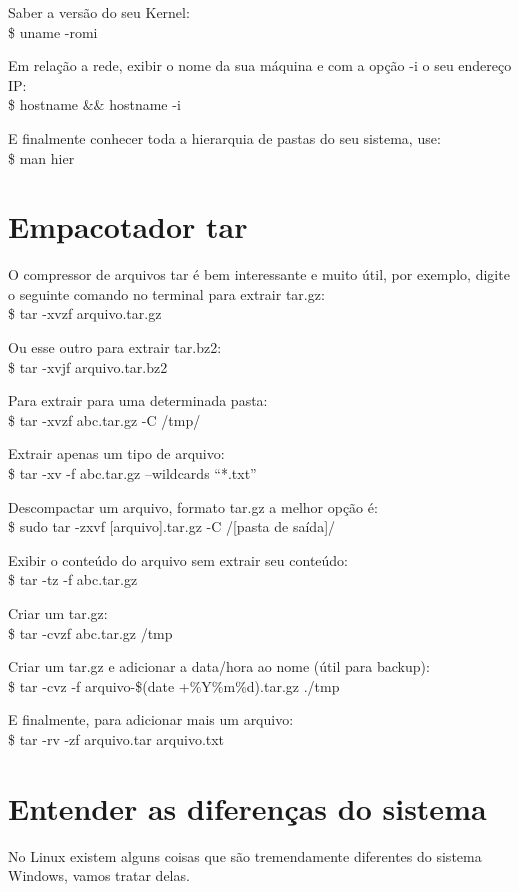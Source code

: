 Saber a versão do seu Kernel: \\
{\ttfamily\$ uname -romi}

Em relação a rede, exibir o nome da sua máquina e com a opção -i o seu endereço IP: \\
{\ttfamily\$ hostname \&\& hostname -i}

E finalmente conhecer toda a hierarquia de pastas do seu sistema, use: \\
{\ttfamily\$ man hier}

\section{Empacotador tar}
O compressor de arquivos tar é bem interessante e muito útil, por exemplo, digite o seguinte comando no terminal para extrair tar.gz: \\
{\ttfamily\$ tar -xvzf arquivo.tar.gz}

Ou esse outro para extrair tar.bz2: \\
{\ttfamily\$ tar -xvjf arquivo.tar.bz2}

Para extrair para uma determinada pasta: \\
{\ttfamily\$ tar -xvzf abc.tar.gz -C /tmp/}

Extrair apenas um tipo de arquivo: \\
{\ttfamily\$ tar -xv -f abc.tar.gz –wildcards ``*.txt''}

Descompactar um arquivo, formato tar.gz a melhor opção é: \\
{\ttfamily\$ sudo tar -zxvf [arquivo].tar.gz -C /[pasta de saída]/}

Exibir o conteúdo do arquivo sem extrair seu conteúdo: \\
{\ttfamily\$ tar -tz -f abc.tar.gz}

Criar um tar.gz: \\
{\ttfamily\$ tar -cvzf abc.tar.gz /tmp}

Criar um tar.gz e adicionar a data/hora ao nome (útil para backup): \\
{\ttfamily\$ tar -cvz -f arquivo-\$(date +\%Y\%m\%d).tar.gz ./tmp}

E finalmente, para adicionar mais um arquivo: \\
{\ttfamily\$ tar -rv -zf arquivo.tar arquivo.txt}

\section{Entender as diferenças do sistema}
No Linux existem alguns coisas que são tremendamente diferentes do sistema Windows, vamos tratar delas.

